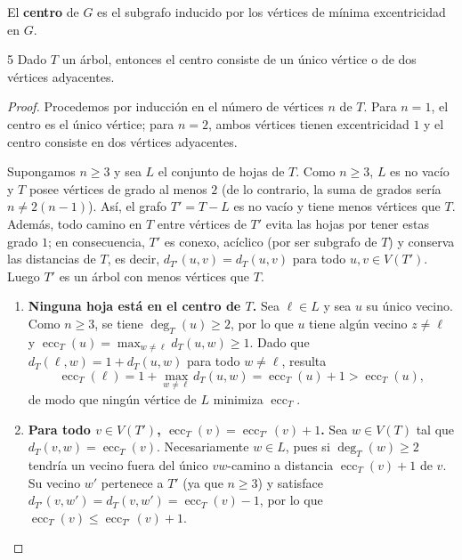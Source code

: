 \begin{definition}
    El \textbf{centro} de \( G \) es el subgrafo inducido por los vértices de mínima excentricidad en \( G \).
\end{definition}

\begin{ejercicio}{5}
    Dado \( T \) un árbol, entonces el centro consiste de un único vértice o de dos vértices adyacentes.
\end{ejercicio}
\begin{proof}
    Procedemos por inducción en el número de vértices \( n \) de \( T \). Para \( n = 1 \), el centro es el único vértice; para \( n = 2 \), ambos vértices tienen excentricidad \( 1 \) y el centro consiste en dos vértices adyacentes.

    Supongamos \( n \geq 3 \) y sea \( L \) el conjunto de hojas de \( T \). Como \( n \geq 3 \), \( L \) es no vacío y \( T \) posee vértices de grado al menos \( 2 \) (de lo contrario, la suma de grados sería \( n \neq 2(n-1) \)). Así, el grafo \( T' = T - L \) es no vacío y tiene menos vértices que \( T \). Además, todo camino en \( T \) entre vértices de \( T' \) evita las hojas por tener estas grado \( 1 \); en consecuencia, \( T' \) es conexo, acíclico (por ser subgrafo de \( T \)) y conserva las distancias de \( T \), es decir, \( d_{T'}(u,v) = d_T(u,v) \) para todo \( u,v \in V(T') \). Luego \( T' \) es un árbol con menos vértices que \( T \).

    \begin{enumerate}
        \item \textbf{Ninguna hoja está en el centro de \( T \).} Sea \( \ell \in L \) y sea \( u \) su único vecino. Como \( n \geq 3 \), se tiene \( \deg_T(u) \geq 2 \), por lo que \( u \) tiene algún vecino \( z \neq \ell \) y \( \operatorname{ecc}_T(u) = \max_{w \neq \ell} d_T(u,w) \geq 1 \). Dado que \( d_T(\ell, w) = 1 + d_T(u,w) \) para todo \( w \neq \ell \), resulta
              \[
                  \operatorname{ecc}_T(\ell) = 1 + \max_{w \neq \ell} d_T(u,w) = \operatorname{ecc}_T(u) + 1 > \operatorname{ecc}_T(u),
              \]
              de modo que ningún vértice de \( L \) minimiza \( \operatorname{ecc}_T \).

        \item \textbf{Para todo \( v \in V(T') \), \( \operatorname{ecc}_T(v) = \operatorname{ecc}_{T'}(v) + 1 \).} Sea \( w \in V(T) \) tal que \( d_T(v,w) = \operatorname{ecc}_T(v) \). Necesariamente \( w \in L \), pues si \( \deg_T(w) \geq 2 \) tendría un vecino fuera del único \( vw \)-camino a distancia \( \operatorname{ecc}_T(v) + 1 \) de \( v \). Su vecino \( w' \) pertenece a \( T' \) (ya que \( n \geq 3 \)) y satisface \( d_{T'}(v,w') = d_T(v,w') = \operatorname{ecc}_T(v) - 1 \), por lo que \( \operatorname{ecc}_T(v) \leq \operatorname{ecc}_{T'}(v) + 1 \).


\end{enumerate}
\end{proof}
